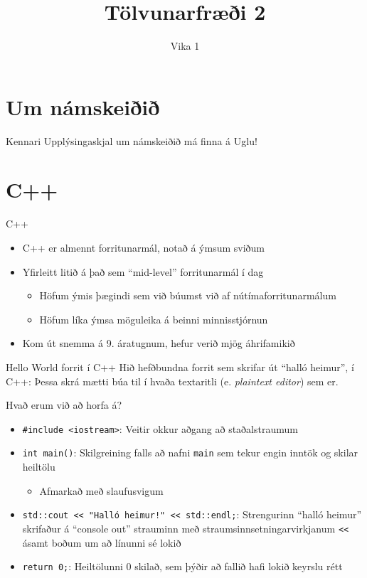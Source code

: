 \documentclass[handout]{beamer}
\title{Tölvunarfræði 2}
\subtitle{Vika 1}
\begin{document}
\begin{frame}
\titlepage
\end{frame}

\section{Um námskeiðið}

\begin{frame}{Kennari}
Upplýsingaskjal um námskeiðið má finna á Uglu!
\end{frame}

\section{C++}

\begin{frame}{C++}
\begin{itemize}
 \item C++ er almennt forritunarmál, notað á ýmsum sviðum
 \item Yfirleitt litið á það sem ``mid-level'' forritunarmál í dag
 \begin{itemize}
  \item Höfum ýmis þægindi sem við búumst við af nútímaforritunarmálum
  \item Höfum líka ýmsa möguleika á beinni minnisstjórnun
 \end{itemize}
 \item Kom út snemma á 9. áratugnum, hefur verið mjög áhrifamikið
\end{itemize}
\end{frame}

\begin{frame}[fragile]{Hello World forrit í C++}
Hið hefðbundna forrit sem skrifar út ``halló heimur'', í C++:
Þessa skrá mætti búa til í hvaða textaritli (e. \emph{plaintext editor}) sem er.
\end{frame}

\begin{frame}[fragile]{Hvað erum við að horfa á?}
\begin{itemize}
 \item \texttt{\#include <iostream>}: Veitir okkur aðgang að staðalstraumum
 \item \texttt{int main()}: Skilgreining falls að nafni \texttt{main} sem tekur engin inntök og skilar heiltölu
 \begin{itemize}
  \item Afmarkað með slaufusvigum
 \end{itemize}
 \item \verb|std::cout << "Halló heimur!" << std::endl;|: Strengurinn ``halló heimur'' skrifaður á ``console out'' strauminn með straumsinnsetningarvirkjanum \verb|<<| ásamt boðum um að línunni sé lokið
 \item \texttt{return 0;}: Heiltölunni 0 skilað, sem þýðir að fallið hafi lokið keyrslu rétt
\end{itemize}
\end{frame}
\end{document}
